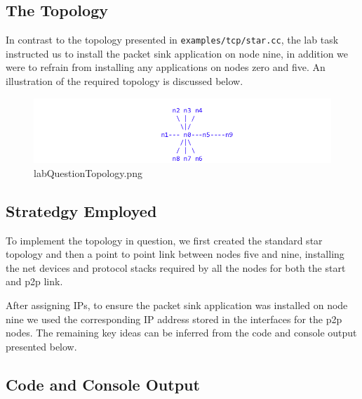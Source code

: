 \documentclass[fullpage]{article}
\begin{document}
\subsection{The Topology}
In contrast to the topology presented in \verb|examples/tcp/star.cc|, the lab task
instructed us to install the packet sink application on node nine, in addition we
were to refrain from installing any applications on nodes zero and five. An illustration
of the required topology is discussed below.

\begin{figure}[H]
  \includegraphics[width=\linewidth]{labQuestionTopology.png}
  \caption{labQuestionTopology.png}
  \label{fig:output1}
\end{figure}

\subsection{Stratedgy Employed}
To implement the topology in question, we first created the standard star topology and then
a point to point link between nodes five and nine, installing the net devices and protocol
stacks required by all the nodes for both the start and p2p link.

After assigning IPs, to ensure the packet sink application was installed on node nine we used
the corresponding IP address stored in the interfaces for the p2p nodes. The remaining key
ideas can be inferred from the code and console output presented below.

\subsection{Code and Console Output}
\end{document}
